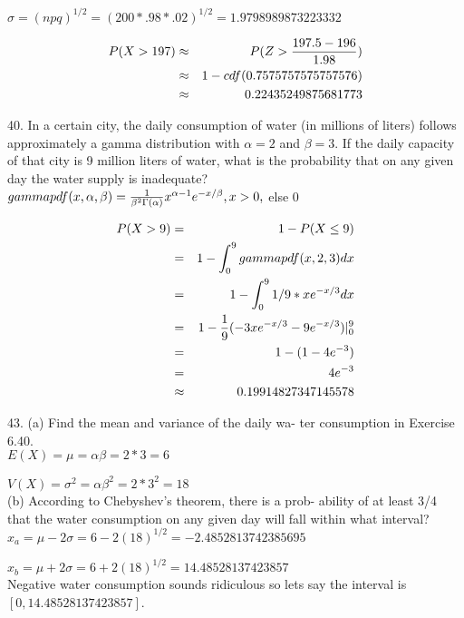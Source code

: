 $\sigma = (npq)^{1/2} = (200 * .98 * .02)^{1/2} = 1.9798989873223332$

\begin{eqnarray*}
P(X > 197) & \approx &  P(Z > \frac{197.5 - 196}{1.98}) \\
& \approx & 1 - cdf(0.7575757575757576) \\
& \approx & 0.22435249875681773
\end{eqnarray*}


40. In a certain city, the daily consumption of water
(in millions of liters) follows approximately a gamma distribution with $\alpha = 2$ and $\beta = 3$. If the daily capacity of that city is 9 million liters of water, what is the probability that on any given day the water supply is inadequate? \\

$gammapdf(x,\alpha, \beta) = \frac{1}{\beta^2 \Gamma(\alpha)} x^{\alpha - 1} e^{-x/\beta} , x > 0, $ else $ 0$

\begin{eqnarray*}
P(X > 9) & = & 1 -  P(X \leq 9) \\
& = & 1- \int^9_0 gammapdf(x,2,3) dx \\
& = & 1- \int^9_0 1/9 * x e^{-x/3} dx \\
& = & 1- \frac{1}{9} (-3xe^{-x/3} - 9e^{-x/3})|^9_0 \\
& = & 1- (1 - 4e^{-3}) \\
& = & 4e^{-3}  \\
& \approx & 0.19914827347145578
\end{eqnarray*}


43. (a) Find the mean and variance of the daily wa-
ter consumption in Exercise 6.40. \\

$E(X) = \mu = \alpha \beta = 2 * 3 = 6$

$V(X) = \sigma^2 = \alpha \beta^2 = 2 * 3^ 2 = 18$ \\

(b) According to Chebyshev’s theorem, there is a prob-
ability of at least 3/4 that the water consumption
on any given day will fall within what interval? \\

$x_a = \mu - 2\sigma = 6 - 2(18)^{1/2} = -2.4852813742385695 $

$x_b = \mu + 2\sigma = 6 + 2(18)^{1/2} = 14.48528137423857 $ \\

Negative water consumption sounds ridiculous so lets say the interval is $[0,14.48528137423857 ]$. \\

